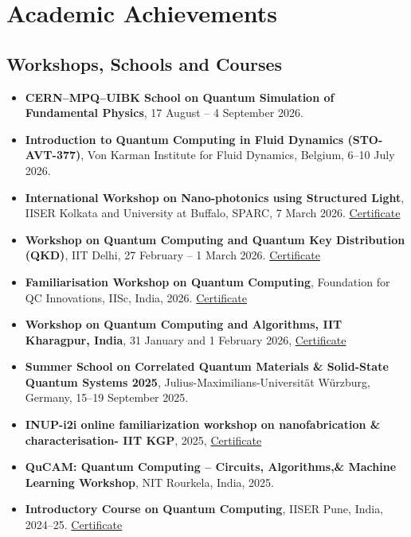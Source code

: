 \documentclass[11pt,a4paper]{article}
\begin{document}

\section{Academic Achievements}
\subsection*{Workshops, Schools and Courses}

\begin{itemize}

    \item \textbf{CERN--MPQ--UIBK School on Quantum Simulation of Fundamental Physics}, 17 August -- 4 September 2026.
    \item \textbf{Introduction to Quantum Computing in Fluid Dynamics (STO-AVT-377)}, Von Karman Institute for Fluid Dynamics, Belgium, 6--10 July 2026.
    \item \textbf{International Workshop on Nano-photonics using Structured Light}, IISER Kolkata and University at Buffalo, SPARC, 7 March 2026. \href{https://drive.google.com/file/d/1uOrKydeN2anYDa1a1ZPAUAngxF0hprEo/view}{Certificate}
    \item \textbf{Workshop on Quantum Computing and Quantum Key Distribution (QKD)}, IIT Delhi, 27 February -- 1 March 2026. \href{https://drive.google.com/file/d/1TL8kjZkPKYqeoUk7mt9nnWZ4h8DkPc3u/view}{Certificate}
    \item \textbf{Familiarisation Workshop on Quantum Computing}, Foundation for QC Innovations, IISc, India, 2026. \href{https://drive.google.com/file/d/1WVQtCkAq4JrkASNk-tq-9vaVKKrF60OO/view}{Certificate}
    \item \textbf{Workshop on Quantum Computing and Algorithms, IIT Kharagpur, India}, 31 January and 1 February 2026,  \href{https://drive.google.com/file/d/1LOt6r0R2hUTHvXDmhl740sPYz4gOO94r/view?usp=drive_link}{Certificate}
    \item \textbf{Summer School on Correlated Quantum Materials \& Solid-State Quantum Systems 2025}, Julius-Maximilians-Universität Würzburg, Germany, 15--19 September 2025.
    \item \textbf{INUP-i2i online familiarization workshop on nanofabrication \& characterisation- IIT KGP}, 2025, \href{https://drive.google.com/file/d/1IqakSE80kBtRvirf6UG0MSezLZISpIji/view?usp=drive_link}{Certificate}
    \item \textbf{QuCAM: Quantum Computing -- Circuits, Algorithms,\& Machine Learning Workshop}, NIT Rourkela, India, 2025.
    \item \textbf{Introductory Course on Quantum Computing},
    IISER Pune, India, 2024--25. \href{https://drive.google.com/file/d/1sgIMb-mWTsk6QFnRIglUeTgSHb6mNWAt/view}{Certificate}


\end{itemize}
\end{document}
